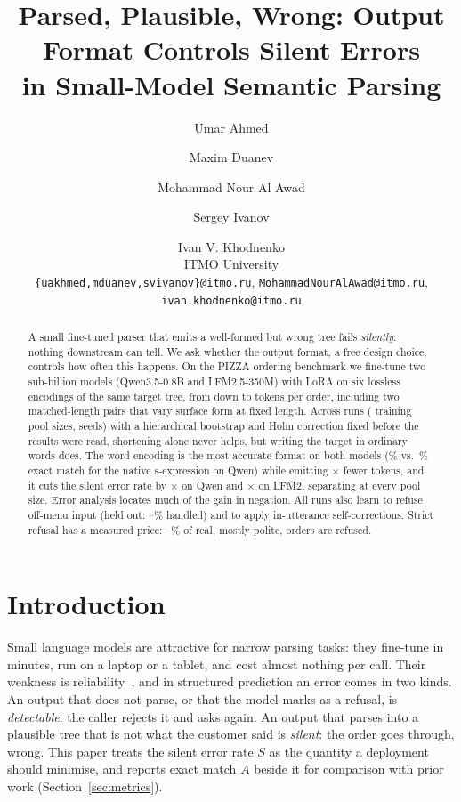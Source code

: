\documentclass[11pt]{article}
\title{Parsed, Plausible, Wrong: Output Format Controls Silent Errors\\in Small-Model Semantic Parsing}
\author{
Umar Ahmed \and Maxim Duanev \and Mohammad Nour Al Awad \and Sergey Ivanov \and Ivan V. Khodnenko \\
ITMO University \\
\texttt{\{uakhmed,mduanev,svivanov\}@itmo.ru}, \texttt{MohammadNourAlAwad@itmo.ru}, \texttt{ivan.khodnenko@itmo.ru}
}
\newcommand{\Qlab}{Qwen3.5-0.8B}
\newcommand{\Llab}{LFM2.5-350M}
\begin{document}
\maketitle

\begin{abstract}
A small fine-tuned parser that emits a well-formed but wrong tree fails
\emph{silently}: nothing downstream can tell. We ask whether the output format,
a free design choice, controls how often this happens. On the PIZZA ordering
benchmark we fine-tune two sub-billion models (\Qlab{} and \Llab{}) with LoRA on
six lossless encodings of the same target tree, from \QexrTok{} down to
\QwordsTok{} tokens per order, including two matched-length pairs that vary
surface form at fixed length. Across \nGrid{} runs (\nSizes{} training pool sizes,
\nSeeds{} seeds) with a hierarchical bootstrap and Holm correction fixed before
the results were read, shortening alone never helps, but writing the target in
ordinary words does. The word encoding is the most accurate format on both models
(\QwordsEm{}\% vs.\ \QexrEm{}\% exact match for the native s-expression on Qwen)
while emitting \QtokRatio{}$\times$ fewer tokens, and it cuts the silent error
rate by \QsilentRatio{}$\times$ on Qwen and \LsilentRatio{}$\times$ on LFM2,
separating at every pool size. Error analysis locates much of the gain in
negation. All runs also learn to refuse off-menu input (held out: \QnegMin{}--\QnegMax{}\%
handled) and to apply in-utterance self-corrections. Strict refusal has a measured
price: \QrefuseMin{}--\LrefuseMax{}\% of real, mostly polite, orders are refused.
\end{abstract}

\section{Introduction}

Small language models are attractive for narrow parsing tasks: they fine-tune in
minutes, run on a laptop or a tablet, and cost almost nothing per call. Their
weakness is reliability~\citep{hallucination}, and in structured prediction an
error comes in two kinds. An output that does not parse, or that the model marks
as a refusal, is \emph{detectable}: the caller rejects it and asks again. An
output that parses into a plausible tree that is not what the customer said is
\emph{silent}: the order goes through, wrong. This paper treats the silent error
rate $S$ as the quantity a deployment should minimise, and reports exact match
$A$ beside it for comparison with prior work (Section~\ref{sec:metrics}).
\end{document}
